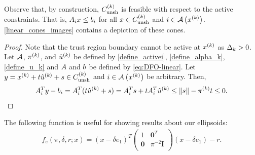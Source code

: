 \documentclass{article}
\begin{document}

Observe that, by construction, ${C^{(k)}_{\textrm{unsh}}}$ is feasible with respect to the active constraints.
That is, ${A}_i x \le {b}_i$ for all $x \in {C^{(k)}_{\textrm{unsh}}}$ and $i \in {\mathcal A}\left(x^{(k)}\right)$.
\cref{linear_cones_images} contains a depiction of these cones.




\begin{proof}

Note that the trust region boundary cannot be active at $x^{(k)}$ as $\Delta_k > 0$.
Let ${\mathcal A}$, $\pi^{(k)}$, and ${{{\hat u}^{(k)}}}$ be defined by \cref{define_activei}, \cref{define_alpha_k}, \cref{define_u_k} and
${A}$ and ${b}$ be defined by \cref{eq:DFO-linear}.
Let $y = x^{(k)} + t{{{\hat u}^{(k)}}} + s \in {C^{(k)}_{\textrm{unsh}}}$ and $i \in {\mathcal A}\left(x^{(k)}\right)$ be arbitrary.
Then,
\begin{align*}
{{A}}_{i}^Ty - {{b}}_{i} = {{A}}_{i}^T(t{{{\hat u}^{(k)}}} + s) = {{A}}_{i}^Ts + t {{A}}_{i}^T{{{\hat u}^{(k)}}} \le \|s\| - \pi^{(k)} t \le 0.
\end{align*}
\end{proof}

The following function is useful for showing results about our ellipsoids:
\begin{align}
f_{e}(\pi, \delta, r; x) = (x - \delta e_1)^T
\begin{pmatrix}
1 & \boldsymbol0^T \\
\boldsymbol 0 & \pi^{-2} \boldsymbol I \\
\end{pmatrix}
(x - \delta e_1) - r. \label{define_ellipsoid_function}
\end{align}
\end{document}
